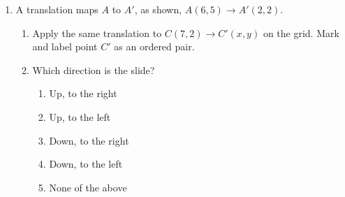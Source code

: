 \begin{enumerate}
\item A translation maps $A$ to $A'$, as shown, $A(6,5) \rightarrow A'(2,2)$.
\begin{multicols}{2}
\begin{enumerate}
  \item Apply the same translation to $C(7,2)\rightarrow C'(x,y)$ on the grid. Mark and label point $C'$ as an ordered pair.
  \item Which direction is the slide?
  \begin{enumerate}[label=(\Alph*)]
    \item Up, to the right
    \item Up, to the left
    \item Down, to the right
    \item Down, to the left
    \item None of the above
  \end{enumerate} \vspace{2cm}
  \end{enumerate}
  \begin{flushright}
  \end{flushright}
\end{multicols}


\end{enumerate}
